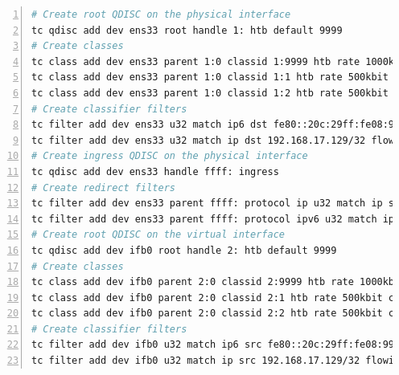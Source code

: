 \newpage

\begin{lstlisting}[language=sh, caption = TC Configuration, captionpos=b, numbers=left, frame=single, breaklines=true, breakatwhitespace=true, showstringspaces=false, label=TC Configuration, basicstyle=\normalsize]
# Create root QDISC on the physical interface
tc qdisc add dev ens33 root handle 1: htb default 9999
# Create classes
tc class add dev ens33 parent 1:0 classid 1:9999 htb rate 1000kbit ceil 1000kbit burst 5k prio 9999 mtu 1500
tc class add dev ens33 parent 1:0 classid 1:1 htb rate 500kbit ceil 500kbit burst 5k prio 1 mtu 1500
tc class add dev ens33 parent 1:0 classid 1:2 htb rate 500kbit ceil 500kbit burst 5k prio 2 mtu 1500
# Create classifier filters 
tc filter add dev ens33 u32 match ip6 dst fe80::20c:29ff:fe08:993c/128 flowid 1:1
tc filter add dev ens33 u32 match ip dst 192.168.17.129/32 flowid 1:2
# Create ingress QDISC on the physical interface
tc qdisc add dev ens33 handle ffff: ingress
# Create redirect filters
tc filter add dev ens33 parent ffff: protocol ip u32 match ip src 0.0.0.0/0 action mirred egress redirect dev ifb0
tc filter add dev ens33 parent ffff: protocol ipv6 u32 match ip6 src ::0/0 action mirred egress redirect dev ifb0
# Create root QDISC on the virtual interface
tc qdisc add dev ifb0 root handle 2: htb default 9999
# Create classes
tc class add dev ifb0 parent 2:0 classid 2:9999 htb rate 1000kbit ceil 1000kbit burst 5k prio 9999 mtu 1500
tc class add dev ifb0 parent 2:0 classid 2:1 htb rate 500kbit ceil 500kbit burst 5k prio 1 mtu 1500
tc class add dev ifb0 parent 2:0 classid 2:2 htb rate 500kbit ceil 500kbit burst 5k prio 2 mtu 1500
# Create classifier filters
tc filter add dev ifb0 u32 match ip6 src fe80::20c:29ff:fe08:993c/128 flowid 2:1
tc filter add dev ifb0 u32 match ip src 192.168.17.129/32 flowid 2:2
\end{lstlisting}